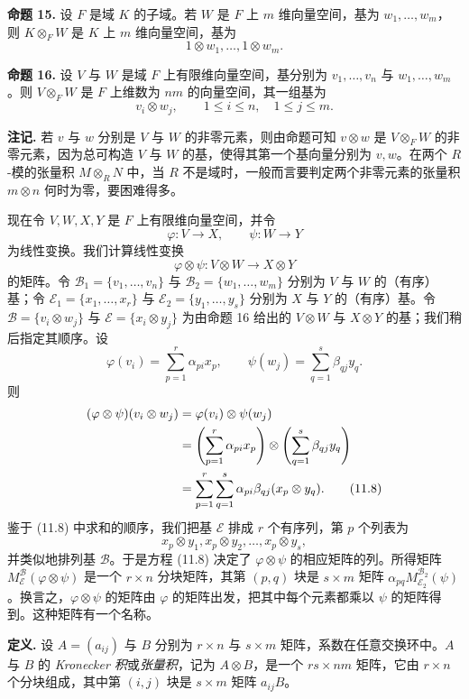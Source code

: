 \noindent\textbf{命题 15.} 设 $F$ 是域 $K$ 的子域。若 $W$ 是 $F$ 上 $m$ 维向量空间，基为 $w_1,\ldots,w_m$，则 $K\otimes_F W$ 是 $K$ 上 $m$ 维向量空间，基为
\[
1\otimes w_1,\ldots,1\otimes w_m.
\]

\noindent\textbf{命题 16.} 设 $V$ 与 $W$ 是域 $F$ 上有限维向量空间，基分别为 $v_1,\ldots,v_n$ 与 $w_1,\ldots,w_m$。则 $V\otimes_F W$ 是 $F$ 上维数为 $nm$ 的向量空间，其一组基为
\[
v_i\otimes w_j,
\qquad 1\leq i\leq n,
\quad 1\leq j\leq m.
\]

\noindent\textbf{注记.} 若 $v$ 与 $w$ 分别是 $V$ 与 $W$ 的非零元素，则由命题可知 $v\otimes w$ 是 $V\otimes_F W$ 的非零元素，因为总可构造 $V$ 与 $W$ 的基，使得其第一个基向量分别为 $v,w$。在两个 $R$-模的张量积 $M\otimes_R N$ 中，当 $R$ 不是域时，一般而言要判定两个非零元素的张量积 $m\otimes n$ 何时为零，要困难得多。

现在令 $V,W,X,Y$ 是 $F$ 上有限维向量空间，并令
\[
\varphi:V\to X,
\qquad
\psi:W\to Y
\]
为线性变换。我们计算线性变换
\[
\varphi\otimes\psi:V\otimes W\to X\otimes Y
\]
的矩阵。令 $\mathcal B_1=\{v_1,\ldots,v_n\}$ 与 $\mathcal B_2=\{w_1,\ldots,w_m\}$ 分别为 $V$ 与 $W$ 的（有序）基；令 $\mathcal E_1=\{x_1,\ldots,x_r\}$ 与 $\mathcal E_2=\{y_1,\ldots,y_s\}$ 分别为 $X$ 与 $Y$ 的（有序）基。令 $\mathcal B=\{v_i\otimes w_j\}$ 与 $\mathcal E=\{x_i\otimes y_j\}$ 为由命题 16 给出的 $V\otimes W$ 与 $X\otimes Y$ 的基；我们稍后指定其顺序。设
\[
\varphi(v_i)=\sum_{p=1}^r\alpha_{pi}x_p,
\qquad
\psi(w_j)=\sum_{q=1}^s\beta_{qj}y_q.
\]
则
\begin{align}
(\varphi\otimes\psi)(v_i\otimes w_j)
&=\varphi(v_i)\otimes\psi(w_j)\notag\\
&=\left(\sum_{p=1}^r\alpha_{pi}x_p\right)
\otimes
\left(\sum_{q=1}^s\beta_{qj}y_q\right)\notag\\
&=\sum_{p=1}^r\sum_{q=1}^s\alpha_{pi}\beta_{qj}(x_p\otimes y_q).
\tag{11.8}
\end{align}
鉴于 (11.8) 中求和的顺序，我们把基 $\mathcal E$ 排成 $r$ 个有序列，第 $p$ 个列表为
\[
x_p\otimes y_1,
 x_p\otimes y_2,
 \ldots,
 x_p\otimes y_s,
\]
并类似地排列基 $\mathcal B$。于是方程 (11.8) 决定了 $\varphi\otimes\psi$ 的相应矩阵的列。所得矩阵 $M_{\mathcal E}^{\mathcal B}(\varphi\otimes\psi)$ 是一个 $r\times n$ 分块矩阵，其第 $(p,q)$ 块是 $s\times m$ 矩阵 $\alpha_{pq}M_{\mathcal E_2}^{\mathcal B_2}(\psi)$。换言之，$\varphi\otimes\psi$ 的矩阵由 $\varphi$ 的矩阵出发，把其中每个元素都乘以 $\psi$ 的矩阵得到。这种矩阵有一个名称。

\noindent\textbf{定义.} 设 $A=(a_{ij})$ 与 $B$ 分别为 $r\times n$ 与 $s\times m$ 矩阵，系数在任意交换环中。$A$ 与 $B$ 的 \emph{Kronecker 积}或\emph{张量积}，记为 $A\otimes B$，是一个 $rs\times nm$ 矩阵，它由 $r\times n$ 个分块组成，其中第 $(i,j)$ 块是 $s\times m$ 矩阵 $a_{ij}B$。

